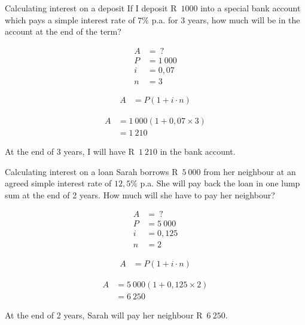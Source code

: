\begin{wex}{Calculating interest on a deposit}{
    If I deposit R~$1 000$ into a special bank account which pays a simple interest rate of $7\%$ p.a. for 3 years, how much will be in the account at the end of the term?}{

    \begin{align*}
	A &= ~?\\
	P &= 1~000\\
	i &= 0,07\\
	n &= 3
    \end{align*}
    
    \begin{align*}
	A &= P(1 + i \cdot n)
    \end{align*}

    \begin{align*}
	A &= 1~000(1 + 0,07 \times 3)\\
	  &= 1~210
    \end{align*}

    At the end of 3 years, I will have R~$1~210$ in the bank account.
    }
\end{wex}


\begin{wex}{Calculating interest on a loan}{
    Sarah borrows R~$5~000$ from her neighbour at an agreed simple interest rate of $12,5\%$ p.a. She will pay back the loan in one lump sum at the end of 2 years. How much will she have to pay her neighbour?}{

    \begin{align*}
	A &= ~?\\
	P &= 5~000\\
	i &= 0,125\\
	n &= 2
    \end{align*}

    \begin{align*}
	A &= P(1 + i \cdot n)
    \end{align*}

    \begin{align*}
	A &= 5~000(1 + 0,125 \times 2)\\
	  &= 6~250
    \end{align*}

    At the end of 2 years, Sarah will pay her neighbour R~$6~250$.
    }
\end{wex}


